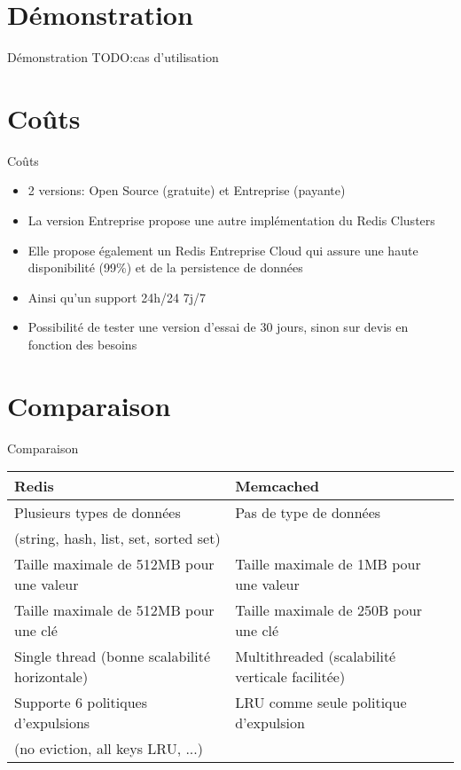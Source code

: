 \documentclass[aspectratio=169]{beamer}
\newcommand{\TODO}{TODO:}
\begin{document}
\section{Démonstration}
\begin{frame}{Démonstration}
\TODO cas d'utilisation
\end{frame}

\section{Coûts}
\begin{frame}{Coûts}
\begin{center}

\begin{itemize}
    \item 2 versions: Open Source (gratuite) et Entreprise (payante)
    \item La version Entreprise propose une autre implémentation du Redis Clusters
    \item Elle propose également un Redis Entreprise Cloud qui assure une haute disponibilité (99\%) et de la persistence de données
    \item Ainsi qu'un support 24h/24 7j/7
    \item Possibilité de tester une version d'essai de 30 jours, sinon sur devis en fonction des besoins
\end{itemize}
\end{center}
\end{frame}

\section{Comparaison}
\begin{frame}{Comparaison}
 \begin{center}\small
  \begin{tabular}{|l|l|}
     \hline
      \textbf{Redis} & \textbf{Memcached} \\
     \hline
     \hline
        Plusieurs types de données & Pas de type de données  \\
        (string, hash, list, set, sorted set) & \\
     \hline
     Taille maximale de 512MB pour une valeur & Taille maximale de 1MB pour une valeur \\
     \hline
     Taille maximale de 512MB pour une clé  & Taille maximale de 250B pour une clé \\ 
     \hline
     Single thread (bonne scalabilité horizontale) & Multithreaded (scalabilité verticale facilitée) \\
     \hline
    Supporte 6 politiques d'expulsions & LRU comme seule politique d'expulsion  \\
     (no eviction, all keys LRU, ...) & \\
     \hline
     \end{tabular}
 \end{center}
\end{frame}
\end{document}
